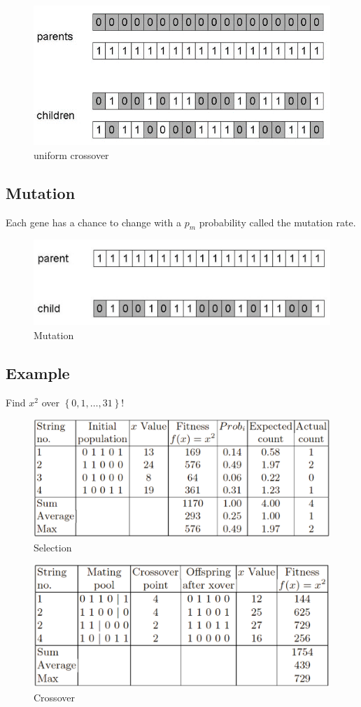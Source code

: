 \documentclass[a4paper,12pt,answers]{article}
\begin{document}
	\begin{figure}[H]
		\centering
		\includegraphics[width=0.7\linewidth]{uniform_cross}
		\caption{uniform crossover}
		\label{fig:uniformcross}
	\end{figure}
	
	
	\subsection{Mutation}
	Each gene has a chance to change with a $p_m$ probability called the mutation rate.
	\begin{figure}[H]
		\centering
		\includegraphics[width=0.7\linewidth]{mutation}
		\caption{Mutation}
		\label{fig:mutation}
	\end{figure}
	
	
	\newpage
	\subsection{Example}
	Find $x^2$ over $ \left\lbrace 0,1,\dots,31 \right\rbrace $! 	
	\begin{figure}[H]
		\centering
		\includegraphics[width=0.7\linewidth]{goldberg_selection}
		\caption{Selection}
		\label{fig:goldbergselection}
	\end{figure}
	
	\begin{figure}[H]
		\centering
		\includegraphics[width=0.7\linewidth]{goldberg_crossover}
		\caption{Crossover}
		\label{fig:goldbergcrossover}
	\end{figure}
	
\end{document}

